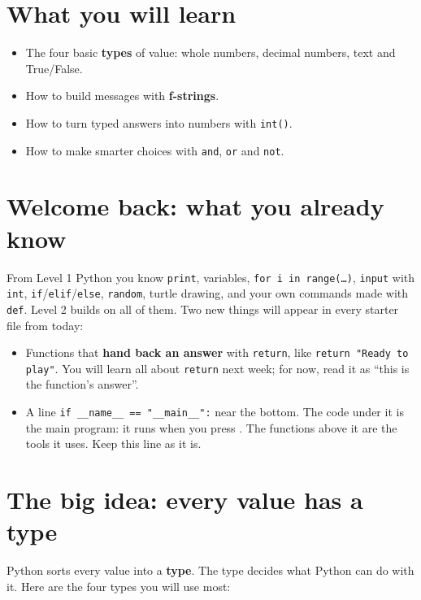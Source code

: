
\section{What you will learn}
\begin{itemize}[leftmargin=1.2em]
  \item The four basic \textbf{types} of value: whole numbers, decimal numbers, text and True/False.
  \item How to build messages with \textbf{f-strings}.
  \item How to turn typed answers into numbers with \texttt{int()}.
  \item How to make smarter choices with \texttt{and}, \texttt{or} and \texttt{not}.
\end{itemize}

\section{Welcome back: what you already know}
From Level 1 Python you know \texttt{print}, variables, \texttt{for i in range(\ldots)}, \texttt{input} with \texttt{int},
\texttt{if}/\texttt{elif}/\texttt{else}, \texttt{random}, turtle drawing, and your own commands made with \texttt{def}.
Level 2 builds on all of them. Two new things will appear in every starter file from today:
\begin{itemize}[leftmargin=1.2em]
  \item Functions that \textbf{hand back an answer} with \texttt{return}, like \texttt{return "Ready to play"}. You will learn all about \texttt{return} next week;
        for now, read it as \enquote{this is the function's answer}.
  \item A line \texttt{if \_\_name\_\_ == "\_\_main\_\_":} near the bottom. The code under it is the main program: it runs when you press .
        The functions above it are the tools it uses. Keep this line as it is.
\end{itemize}

\section{The big idea: every value has a type}
Python sorts every value into a \textbf{type}. The type decides what Python can do with it.
Here are the four types you will use most:

